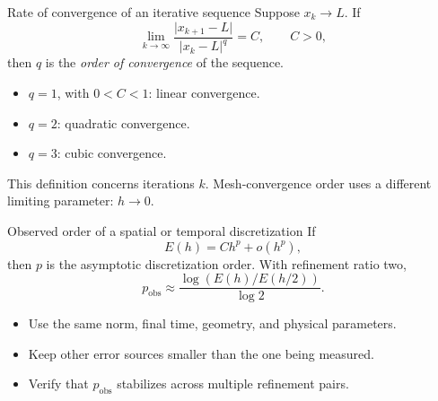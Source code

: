 \documentclass[aspectratio=169,11pt]{beamer}
\begin{document}
\begin{frame}{Rate of convergence of an iterative sequence}
Suppose \(x_k\to L\). If
\[
  \lim_{k\to\infty}
  \frac{\lvert x_{k+1}-L\rvert}
       {\lvert x_k-L\rvert^q}
  =
  C,
  \qquad C>0,
\]
then \(q\) is the \emph{order of convergence} of the sequence.
\begin{itemize}\itemsep7pt
  \item \(q=1\), with \(0<C<1\): linear convergence.
  \item \(q=2\): quadratic convergence.
  \item \(q=3\): cubic convergence.
\end{itemize}
\begin{punchbox}
\small This definition concerns iterations \(k\). Mesh-convergence order uses a different limiting parameter: \(h\to0\).
\end{punchbox}
\end{frame}

\begin{frame}{Observed order of a spatial or temporal discretization}
If
\[
  E(h)=C h^p+o(h^p),
\]
then \(p\) is the asymptotic discretization order. With refinement ratio two,
\[
  \boxed{
  p_{\mathrm{obs}}
  \approx
  \frac{\log\!\left(E(h)/E(h/2)\right)}{\log 2}
  }.
\]
\begin{itemize}\itemsep6pt
  \item Use the same norm, final time, geometry, and physical parameters.
  \item Keep other error sources smaller than the one being measured.
  \item Verify that \(p_{\mathrm{obs}}\) stabilizes across multiple refinement pairs.
\end{itemize}
\end{frame}
\end{document}
